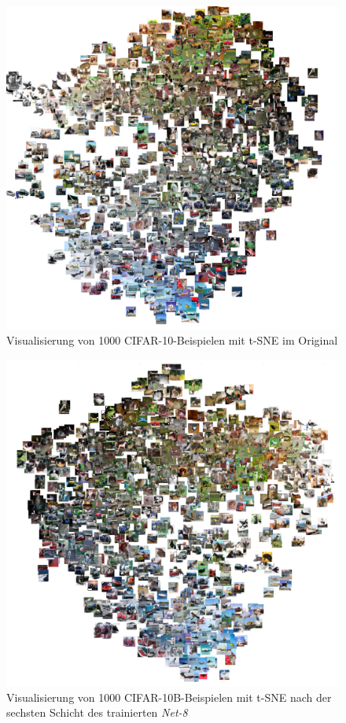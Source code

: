 \begin{figure}[H]
\centering
\includegraphics[width=0.8\linewidth]{images/6_cifar_tsne_combined_white_small2a}
\caption[]{Visualisierung von 1000 CIFAR-10-Beispielen mit t-SNE im Original}
\label{fig:6_tsne_cifara}
\end{figure}

\begin{figure}[H]
\centering
\includegraphics[width=0.8\linewidth]{images/6_cifar_tsne_combined_white_small2b}
\caption[]{Visualisierung von 1000 CIFAR-10B-Beispielen mit t-SNE nach der sechsten Schicht des trainierten \textit{Net-8}}
\label{fig:6_tsne_cifarb}
\end{figure}
		

